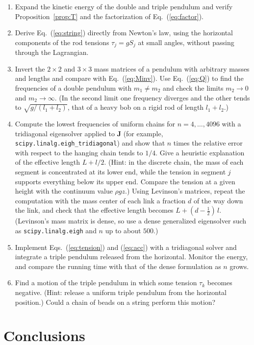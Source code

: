 \documentclass[11pt]{article}
\newcommand{\J}{\mathbf{J}}
\begin{document}
\begin{enumerate}
  \item Expand the kinetic energy of the double and triple pendulum and verify Proposition~\ref{prop:T} and the factorization of Eq.~(\ref{eq:factor}).
  \item Derive Eq.~(\ref{eq:string}) directly from Newton's law, using the horizontal components of the rod tensions $\tau_j=gS_j$ at small angles, without passing through the Lagrangian.
  \item Invert the $2\times2$ and $3\times3$ mass matrices of a pendulum with arbitrary masses and lengths and compare with Eq.~(\ref{eq:Minv}). Use Eq.~(\ref{eq:Q}) to find the frequencies of a double pendulum with $m_1\neq m_2$ and check the limits $m_2\to0$ and $m_2\to\infty$. (In the second limit one frequency diverges and the other tends to $\sqrt{g/(l_1+l_2)}$, that of a heavy bob on a rigid rod of length $l_1+l_2$.)
  \item Compute the lowest frequencies of uniform chains for $n=4,\dots,4096$ with a tridiagonal eigensolver applied to $\J$ (for example, \texttt{scipy.linalg.eigh\_tridiagonal}) and show that $n$ times the relative error with respect to the hanging chain tends to $1/4$. Give a heuristic explanation of the effective length $L+l/2$. (Hint: in the discrete chain, the mass of each segment is concentrated at its lower end, while the tension in segment $j$ supports everything below its upper end. Compare the tension at a given height with the continuum value $\rho gz$.) Using Levinson's matrices,\cite{levinson1977natural} repeat the computation with the mass center of each link a fraction $d$ of the way down the link, and check that the effective length becomes $L+(d-\frac12)\,l$. (Levinson's mass matrix is dense, so use a dense generalized eigensolver such as \texttt{scipy.linalg.eigh} and $n$ up to about $500$.)
  \item Implement Eqs.~(\ref{eq:tension}) and (\ref{eq:acc}) with a tridiagonal solver and integrate a triple pendulum released from the horizontal. Monitor the energy, and compare the running time with that of the dense formulation as $n$ grows.
  \item Find a motion of the triple pendulum in which some tension $\tau_k$ becomes negative. (Hint: release a uniform triple pendulum from the horizontal position.) Could a chain of beads on a string perform this motion?
\end{enumerate}

\section{Conclusions}
\end{document}
